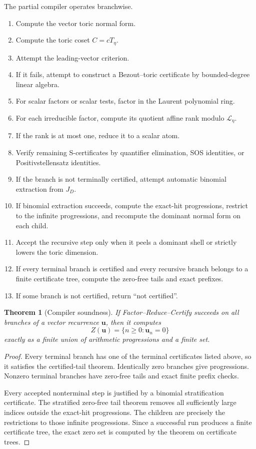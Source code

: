 \documentclass[11pt]{article}
\newtheorem{theorem}{Theorem}[section]
\begin{document}
The partial compiler operates branchwise.
\begin{enumerate}
\item Compute the vector toric normal form.
\item Compute the toric coset \(C=cT_\eta\).
\item Attempt the leading-vector criterion.
\item If it fails, attempt to construct a Bezout--toric certificate by bounded-degree linear algebra.
\item For scalar factors or scalar tests, factor in the Laurent polynomial ring.
\item For each irreducible factor, compute its quotient affine rank modulo \(\mathcal L_\eta\).
\item If the rank is at most one, reduce it to a scalar atom.
\item Verify remaining S-certificates by quantifier elimination, SOS identities, or Positivstellensatz identities.
\item If the branch is not terminally certified, attempt automatic binomial extraction from \(J_D\).
\item If binomial extraction succeeds, compute the exact-hit progressions, restrict to the infinite progressions, and recompute the dominant normal form on each child.
\item Accept the recursive step only when it peels a dominant shell or strictly lowers the toric dimension.
\item If every terminal branch is certified and every recursive branch belongs to a finite certificate tree, compute the zero-free tails and exact prefixes.
\item If some branch is not certified, return ``not certified''.
\end{enumerate}

\begin{theorem}[Compiler soundness]
If Factor--Reduce--Certify succeeds on all branches of a vector recurrence \(\mathbf u\), then it computes
\[
Z(\mathbf u)=\{n\ge0:\mathbf u_n=0\}
\]
exactly as a finite union of arithmetic progressions and a finite set.
\end{theorem}

\begin{proof}
Every terminal branch has one of the terminal certificates listed above, so it satisfies the certified-tail theorem. Identically zero branches give progressions. Nonzero terminal branches have zero-free tails and exact finite prefix checks.

Every accepted nonterminal step is justified by a binomial stratification certificate. The stratified zero-free tail theorem removes all sufficiently large indices outside the exact-hit progressions. The children are precisely the restrictions to those infinite progressions. Since a successful run produces a finite certificate tree, the exact zero set is computed by the theorem on certificate trees.
\end{proof}
\end{document}
